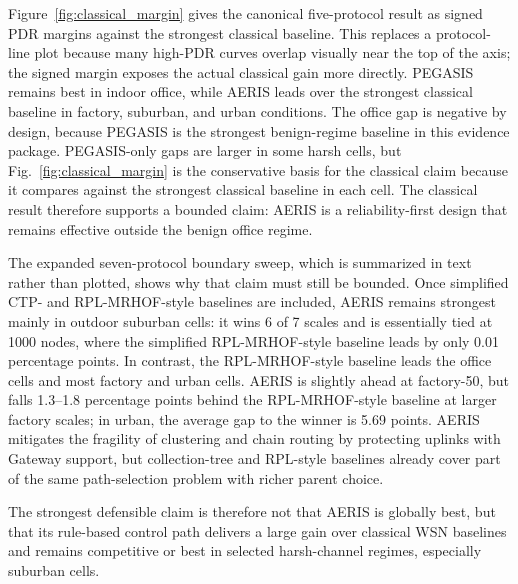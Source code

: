 \documentclass[conference]{IEEEtran}
\begin{document}
Figure~\ref{fig:classical_margin} gives the canonical five-protocol result as signed PDR margins against the strongest classical baseline. This replaces a protocol-line plot because many high-PDR curves overlap visually near the top of the axis; the signed margin exposes the actual classical gain more directly. PEGASIS remains best in indoor office, while AERIS leads over the strongest classical baseline in factory, suburban, and urban conditions. The office gap is negative by design, because PEGASIS is the strongest benign-regime baseline in this evidence package. PEGASIS-only gaps are larger in some harsh cells, but Fig.~\ref{fig:classical_margin} is the conservative basis for the classical claim because it compares against the strongest classical baseline in each cell. The classical result therefore supports a bounded claim: AERIS is a reliability-first design that remains effective outside the benign office regime.

The expanded seven-protocol boundary sweep, which is summarized in text rather than plotted, shows why that claim must still be bounded. Once simplified CTP- and RPL-MRHOF-style baselines are included, AERIS remains strongest mainly in outdoor suburban cells: it wins 6 of 7 scales and is essentially tied at 1000 nodes, where the simplified RPL-MRHOF-style baseline leads by only 0.01 percentage points. In contrast, the RPL-MRHOF-style baseline leads the office cells and most factory and urban cells. AERIS is slightly ahead at factory-50, but falls 1.3--1.8 percentage points behind the RPL-MRHOF-style baseline at larger factory scales; in urban, the average gap to the winner is 5.69 points. AERIS mitigates the fragility of clustering and chain routing by protecting uplinks with Gateway support, but collection-tree and RPL-style baselines already cover part of the same path-selection problem with richer parent choice.

The strongest defensible claim is therefore not that AERIS is globally best, but that its rule-based control path delivers a large gain over classical WSN baselines and remains competitive or best in selected harsh-channel regimes, especially suburban cells.
\end{document}
